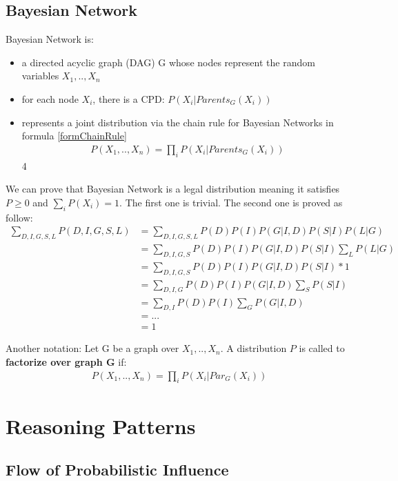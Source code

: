 \subsection{Bayesian Network}
\begin{defi}
	Bayesian Network is:
	\begin{itemize}
		\item a directed acyclic graph (DAG) G whose nodes represent the random variables $X_1,..,X_n$
		\item for each node $X_i$, there is a CPD: $P(X_i | Parents_G(X_i))$
		\item represents a joint distribution via the chain rule for Bayesian Networks in formula \ref{formChainRule} 
		\begin{align}\label{formChainRule}
		P(X_1,..,X_n) = \prod_i P(X_i|Parents_G(X_i))
		\end{align}
		4
	\end{itemize}
\end{defi}
We can prove that Bayesian Network is a legal distribution meaning it satisfies $P \geq 0$ and $\sum_i P(X_i) = 1$. The first one is trivial. The second one is proved as follow:
\begin{align*}
\sum_{D,I,G,S,L} P(D,I,G,S,L) 	&= \sum_{D,I,G,S,L} P(D)P(I)P(G|I,D)P(S|I)P(L|G) \\
								&= \sum_{D,I,G,S} P(D)P(I)P(G|I,D)P(S|I) \sum_L P(L|G) \\
								&= \sum_{D,I,G,S} P(D)P(I)P(G|I,D)P(S|I) * 1\\
								&= \sum_{D,I,G} P(D)P(I)P(G|I,D) \sum_S P(S|I)\\
								&= \sum_{D,I} P(D)P(I) \sum_G P(G|I,D)\\
								&= ...\\
								&= 1
\end{align*}

Another notation: Let G be a graph over $X_1, .., X_n$. A distribution $P$ is called to \textbf{factorize over graph G} if:
\begin{align*}
P(X_1, .., X_n) = \prod_i P(X_i | Par_G(X_i))
\end{align*}

\section{Reasoning Patterns}

\subsection{Flow of Probabilistic Influence} \label{w1subsecFlowProbaInfl}


